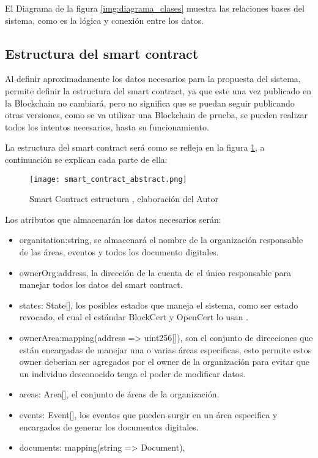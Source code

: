   El Diagrama de la figura \ref{img:diagrama_clases} muestra las relaciones bases del sistema,  como es la lógica y conexión entre los datos.

 

  \subsection{Estructura del smart contract}
  Al definir aproximadamente los datos necesarios para la propuesta del sistema, permite definir 
  la estructura del smart contract, ya que este una vez publicado en la  Blockchain no cambiará, pero no significa
  que se puedan seguir publicando otras versiones, como se va utilizar una  Blockchain de prueba, se pueden realizar todos los intentos necesarios,
  hasta su funcionamiento. 

  La estructura del smart contract será como se refleja en la figura \ref{img:smart_contract_structure}, a continuación se explican cada parte de ella:

  
\begin{figure}[hbt!]
    \centering
    {\texttt{[image: smart\_contract\_abstract.png]}}
    \caption{Smart Contract estructura , elaboración del Autor}
    \label{img:smart_contract_structure}
  \end{figure}
Los atributos que almacenarán los datos necesarios serán:
  \begin{itemize}
    \item organitation:string, se almacenará el nombre de la organización responsable de las áreas, eventos y todos los documento digitales.
    \item ownerOrg:address, la dirección de la cuenta de el único responsable para manejar todos los datos del smart contract.
    \item states: State[], los posibles estados que maneja el sistema, como ser estado revocado, el cual el estándar BlockCert y OpenCert lo usan \cite[]{blockcerts_faq_nodate,opencerts_gestion_nodate}.
    \item ownerArea:mapping(address => uint256[]), son el conjunto de direcciones que están encargadas de manejar una o varias áreas especificas, esto permite 
    estos owner deberian ser agregados por el owner de la organización para evitar que un individuo desconocido tenga el poder de modificar datos.
    \item areas: Area[], el conjunto de áreas de la organización.
    \item events: Event[], los eventos que pueden surgir en un área especifica y encargados de generar los documentos digitales.
    \item documents: mapping(string => Document), 
    \end{itemize}

